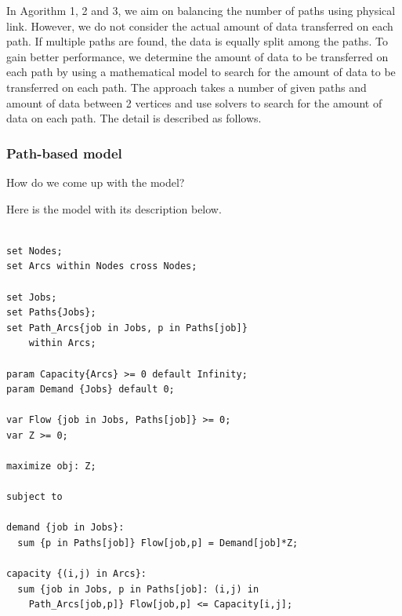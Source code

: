 In Agorithm 1, 2 and 3, we aim on balancing the number of paths using physical link. However, we do not consider the actual amount of data transferred on each path. If multiple paths are found, the data is equally split among the paths. To gain better performance, we determine the amount of data to be transferred on each path by using a mathematical model to search for the amount of data to be transferred on each path. The approach takes a number of given paths and amount of data between 2 vertices and use solvers to search for the amount of data on each path. The detail is described as follows.

\subsubsection{Path-based model}

How do we come up with the model?

Here is the model with its description below.

\begingroup
\fontsize{9pt}{10pt}\selectfont

\begin{verbatim}

set Nodes;
set Arcs within Nodes cross Nodes;

set Jobs;
set Paths{Jobs};
set Path_Arcs{job in Jobs, p in Paths[job]} 
    within Arcs;

param Capacity{Arcs} >= 0 default Infinity;
param Demand {Jobs} default 0;

var Flow {job in Jobs, Paths[job]} >= 0;
var Z >= 0;

maximize obj: Z;

subject to

demand {job in Jobs}:
  sum {p in Paths[job]} Flow[job,p] = Demand[job]*Z;

capacity {(i,j) in Arcs}:
  sum {job in Jobs, p in Paths[job]: (i,j) in 
    Path_Arcs[job,p]} Flow[job,p] <= Capacity[i,j];

\end{verbatim}

\endgroup

